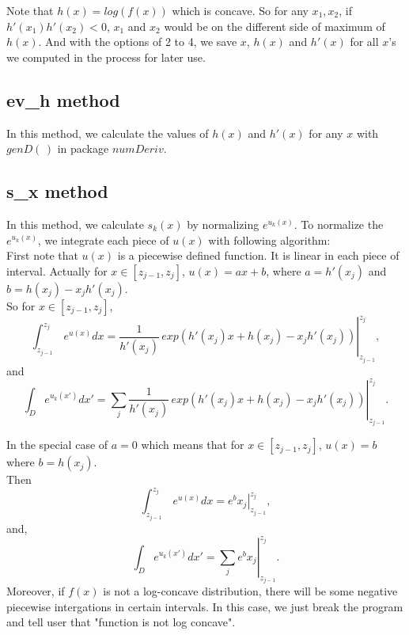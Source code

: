 \documentclass[11pt, oneside]{article}   	%
\begin{document}
Note that $h(x)=log(f(x))$ which is concave. So for any $x_1, x_2$, if $h'(x_1)h'(x_2)<0$, $x_1$ and $x_2$ would be on the different side of maximum of $h(x)$. And with the options of 2 to 4, we save $x$, $h(x)$ and $h'(x)$ for all $x$'s we computed in the process for later use.


\subsection*{ ev\_h method }
In this method, we calculate the values of $h(x)$ and $h'(x)$ for any $x$ with $genD(\,)$ in package $numDeriv$.

\subsection*{ s\_x method }
In this method, we calculate $s_{k}(x)$ by normalizing $e^{ u_{k}(x)}$. To normalize the $e^{ u_{k}(x)}$, we integrate each piece of $u(x)$ with following algorithm: \\
First note that $u(x)$ is a piecewise defined function. It is linear in each piece of interval. Actually for $x \in [z_{j-1}, z_j]$, $u(x) = ax+b $, where $a=h'(x_j)$ and $b=h(x_j)- x_j h'(x_j)$. \\
So for $x \in [z_{j-1}, z_j]$, 
\begin{displaymath}
\int_{z_{j-1}}^{z_j} \, e^{u(x)} dx =\left. \frac{1}{h'(x_j)} \, exp( h'(x_j)x + h(x_j) -x_j h'(x_j))  \right|_{z_{j-1}}^{z_j},
\end{displaymath}
and
\begin{displaymath}
\int_D e^{u_k(x')} dx' = \left.\sum_j \frac{1}{h'(x_j)} \,exp( h'(x_j)x + h(x_j) -x_j h'(x_j))  \right|_{z_{j-1}}^{z_j}.
\end{displaymath}

In the special case of $a=0$ which means that for $x \in [z_{j-1}, z_j]$, $u(x) = b $ where $b=h(x_j)$. \\Then
\begin{displaymath}
 \int_{z_{j-1}}^{z_j} \, e^{u(x)} dx =\left. e^bx_j\right|_{z_{j-1}}^{z_j} , 
\end{displaymath}
and, 
\begin{displaymath}
\int_D e^{u_k(x')} dx' =\left.\sum_j  e^bx_j\right|_{z_{j-1}}^{z_j}.
\end{displaymath}
Moreover, if $f(x)$ is not a log-concave distribution, there will be some negative piecewise intergations in certain intervals. In this case, we just break the program and tell user that "function is not log concave".
\end{document}
